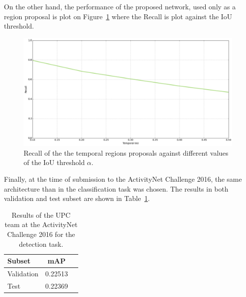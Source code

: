 On the other hand, the performance of the proposed network, used only as a region proposal is plot on Figure~\ref{fig:recall_vs_iou} where the Recall is plot against the IoU threshold.

\begin{figure}[H]
\begin{center}
\includegraphics[width=1\linewidth]{img/results/recall_vs_iou}
\end{center}
\caption{Recall of the the temporal regions proposals against different values of the IoU threshold $\alpha$.}
\label{fig:recall_vs_iou}
\end{figure}



Finally, at the time of submission to the ActivityNet Challenge 2016, the same architecture than in the classification task was chosen. The results in both validation and test subset are shown in Table~\ref{table:detection_results_challenge}.

\begin{table}[H]
\begin{center}
\begin{tabular}{|l|c|c|}
\hline
Subset & mAP \\
\hline\hline
Validation & 0.22513 \\
Test & 0.22369 \\
\hline
\end{tabular}
\end{center}
\caption{Results of the UPC team at the ActivityNet Challenge 2016 for the detection task.}
\label{table:detection_results_challenge}
\end{table}

